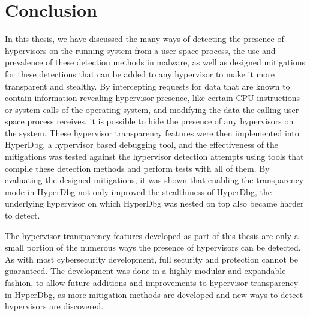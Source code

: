 \clearpage
\section{Conclusion}\label{s:conclusion}

In this thesis, we have discussed the many ways of detecting the presence of hypervisors on the running system from a user-space process, 
the use and prevalence of these detection methods in malware, as well as designed mitigations for these detections that can be added to any hypervisor to make it more transparent and stealthy. 
By intercepting requests for data that are known to contain information revealing hypervisor presence, like certain CPU instructions or system calls of the operating system, 
and modifying the data the calling user-space process receives, it is possible to hide the presence of any hypervisors on the system. 
These hypervisor transparency features were then implemented into HyperDbg, a hypervisor based debugging tool, and the effectiveness of the mitigations was 
tested against the hypervisor detection attempts using tools that compile these detection methods and perform tests with all of them. By evaluating the designed mitigations, 
it was shown that enabling the transparency mode in HyperDbg not only improved the stealthiness of HyperDbg, the underlying hypervisor on which HyperDbg was nested on top also 
became harder to detect.

The hypervisor transparency features developed as part of this thesis are only a small portion of the numerous ways the presence of hypervisors can be detected. 
As with most cybersecurity development, full security and protection cannot be guaranteed. The development was done in a highly modular and expandable fashion, 
to allow future additions and improvements to hypervisor transparency in HyperDbg, as more mitigation methods are developed and new ways to detect hypervisors are discovered. 



